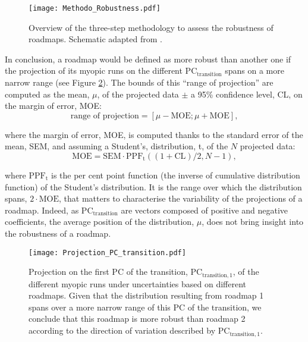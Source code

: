 \begin{figure}[!htbp]
\centering
\texttt{[image: Methodo\_Robustness.pdf]}
\caption{Overview of the three-step methodology to assess the robustness of roadmaps. Schematic adapted from \cite{moret2020overcapacity}.}
\label{fig:Methodo_Robustness}
\end{figure}

In conclusion, a roadmap would be defined as more robust than another one if the projection of its myopic runs on the different $\text{PC}_{\text{transition}}$ spans on a more narrow range (see Figure \ref{fig:Projection_PC_transition}). The bounds of this ``range of projection'' are computed as the mean, $\mu$, of the projected data $\pm$ a 95\% confidence level, CL, on the margin of error, MOE:
$$
\text{range of projection} = [\mu-\mathrm{MOE}; \mu + \mathrm{MOE}],
$$

\noindent
where the margin of error, MOE,  is computed thanks to the standard error of the mean, SEM, and assuming a Student's, distribution, t,  of the $N$ projected data:
$$
\text{MOE} = \mathrm{SEM}\cdot \mathrm{PPF}_{\mathrm{t}}\left((1+\mathrm{CL})/2,N-1\right),
$$

\noindent
where $\mathrm{PPF}_{\mathrm{t}}$ is the per cent point function (\ie the inverse of cumulative distribution function) of the Student's distribution. It is the range over which the distribution spans, $2\cdot \mathrm{MOE}$, that matters to characterise the variability of the projections of a roadmap. Indeed, as $\text{PC}_{\text{transition}}$ are vectors composed of positive and negative coefficients, the average position of the distribution, $\mu$, does not bring insight into the robustness of a roadmap.

\begin{figure}[!htbp]
\centering
\texttt{[image: Projection\_PC\_transition.pdf]}
\caption{Projection on the first PC of the transition, $\text{PC}_{\text{transition},1}$, of the different myopic runs under uncertainties based on different roadmaps. Given that the distribution resulting from roadmap 1 spans over a more narrow range of this PC of the transition, we conclude that this roadmap is more robust than roadmap 2 according to the direction of variation described by $\text{PC}_{\text{transition},1}$.}
\label{fig:Projection_PC_transition}
\end{figure}

